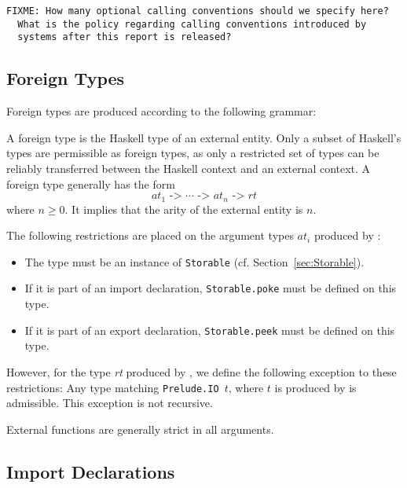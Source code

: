 \documentclass[a4paper,twosides]{article}
\newcommand{\code}[1]{\texttt{#1}}      %
\begin{document}
\begin{verbatim}
FIXME: How many optional calling conventions should we specify here?
  What is the policy regarding calling conventions introduced by
  systems after this report is released?
\end{verbatim}

\subsection{Foreign Types}
\label{sec:foreign-types}

Foreign types are produced according to the following grammar:
%
\begin{grammar}
  \gor{%
    ()}
\end{grammar}
%
A foreign type is the Haskell type of an external entity.  Only a subset of
Haskell's types are permissible as foreign types, as only a restricted set of
types can be reliably transferred between the Haskell context and an external
context.  A foreign type generally has the form
\[
\textit{at}_1\code{ -> }\cdots\code{ -> }\textit{at}_n\code{ -> }\textit{rt}
\]
where \(n\geq0\).  It implies that the arity of the external entity is $n$.

The following restrictions are placed on the argument types \(\textit{at}_i\)
produced by :
%
\begin{itemize}
\item The type must be an instance of \code{Storable}
  (cf. Section~\ref{sec:Storable}).
\item If it is part of an import declaration, \code{Storable.poke} must be
  defined on this type.
\item If it is part of an export declaration, \code{Storable.peek} must be
  defined on this type.
\end{itemize}
%
However, for the type \textit{rt} produced by , we define the
following exception to these restrictions: Any type matching \code{Prelude.IO
  }$t$, where $t$ is produced by  is admissible.  This
exception is not recursive.

External functions are generally strict in all arguments.

\subsection{Import Declarations}
\label{sec:import}
\end{document}
